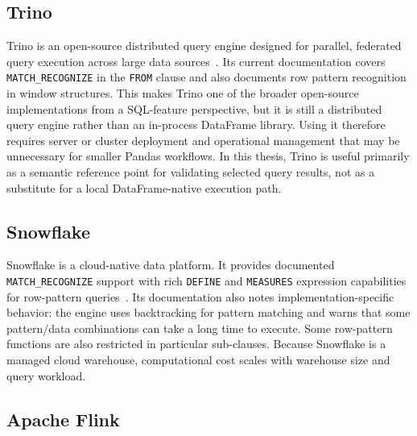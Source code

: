 \subsection{Trino}
\label{subsec:related-trino}

Trino is an open-source distributed query engine designed for
parallel, federated query execution across large data
sources~\cite{trino2022,trino2021row}.  Its current documentation
covers \texttt{MATCH\_RECOGNIZE} in the \texttt{FROM} clause and
also documents row pattern recognition in window structures.  This
makes Trino one of the broader open-source implementations from a
SQL-feature perspective, but it is still a distributed query engine
rather than an in-process DataFrame library.  Using it therefore
requires server or cluster deployment and operational management that
may be unnecessary for smaller Pandas workflows.  In this thesis,
Trino is useful primarily as a semantic reference point for
validating selected query results, not as a substitute for a local
DataFrame-native execution path.

\subsection{Snowflake}
\label{subsec:related-snowflake}

Snowflake is a cloud-native data platform.  It provides documented
\texttt{MATCH\_\allowbreak RECOGNIZE} support with rich
\texttt{DEFINE} and \texttt{MEASURES} expression capabilities for
row-pattern queries~\cite{snowflake2025match_recognize,hoffa2021snowflake}.
Its documentation also notes implementation-specific behavior: the
engine uses backtracking for pattern matching and warns that some
pattern/data combinations can take a long time to execute.  Some
row-pattern functions are also restricted in particular sub-clauses.
Because Snowflake is a managed cloud warehouse, computational cost
scales with warehouse size and query workload.

\subsection{Apache Flink}
\label{subsec:related-flink}

